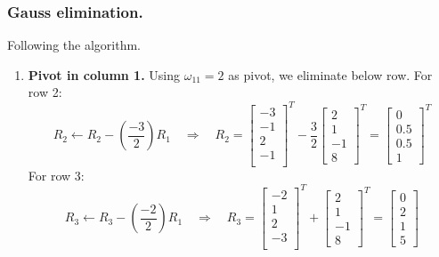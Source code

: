 \documentclass[../../../main.tex]{subfiles}
\begin{document}
\subsubsection{Gauss elimination.}
Following the algorithm.
\begin{enumerate}
    \item \textbf{Pivot in column 1.}
          Using $\omega_{11} = 2$ as pivot, we eliminate below row.
          For row 2:
          \begin{equation*}
              R_2 \leftarrow R_2 - \left(\frac{-3}{2}\right)R_1 \quad \Rightarrow \quad
              R_2=
              \begin{bmatrix}
                  -3 \\-1\\2\\-1\\
              \end{bmatrix}^{T}
              - \frac{3 }{2}
              \begin{bmatrix}
                  2 \\1\\-1\\8
              \end{bmatrix}^{T}
              =
              \begin{bmatrix}
                  0 \\ 0.5 \\ 0.5 \\ 1
              \end{bmatrix}^{T}
          \end{equation*}
          For row 3:
          \begin{equation*}
              R_3 \leftarrow R_3 - \left(\frac{-2}{2}\right)R_1 \quad \Rightarrow \quad
              R_3=
              \begin{bmatrix}
                  -2 \\1\\2\\-3\\
              \end{bmatrix}^{T}
              +
              \begin{bmatrix}
                  2 \\1\\-1\\8
              \end{bmatrix}^{T}
              =
              \begin{bmatrix}
                  0 \\ 2 \\ 1 \\ 5

\end{bmatrix}
\end{equation*}
\end{enumerate}
\end{document}
